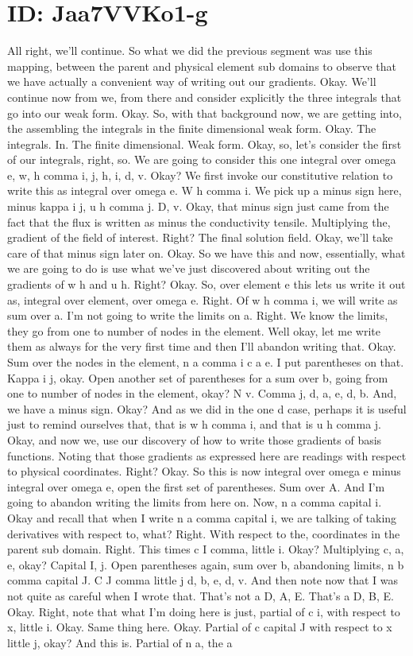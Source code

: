 \documentclass[10pt]{article}
\begin{document}
\section*{ID: Jaa7VVKo1-g}
All right, we'll continue. So what we did the previous segment was use this mapping, between the parent and physical element sub domains to observe that we have actually a convenient way of writing out our gradients. Okay. We'll continue now from we, from there and consider explicitly the three integrals that go into our weak form. Okay. So, with that background now, we are getting into, the assembling the integrals in the finite dimensional weak form. Okay. The integrals. In. The finite dimensional. Weak form. Okay, so, let's consider the first of our integrals, right, so. We are going to consider this one integral over omega e, w, h comma i, j, h, i, d, v. Okay? We first invoke our constitutive relation to write this as integral over omega e. W h comma i. We pick up a minus sign here, minus kappa i j, u h comma j. D, v. Okay, that minus sign just came from the fact that the flux is written as minus the conductivity tensile. Multiplying the, gradient of the field of interest. Right? The final solution field. Okay, we'll take care of that minus sign later on. Okay. So we have this and now, essentially, what we are going to do is use what we've just discovered about writing out the gradients of w h and u h. Right? Okay. So, over element e this lets us write it out as, integral over element, over omega e. Right. Of w h comma i, we will write as sum over a. I'm not going to write the limits on a. Right. We know the limits, they go from one to number of nodes in the element. Well okay, let me write them as always for the very first time and then I'll abandon writing that. Okay. Sum over the nodes in the element, n a comma i c a e. I put parentheses on that. Kappa i j, okay. Open another set of parentheses for a sum over b, going from one to number of nodes in the element, okay? N v. Comma j, d, a, e, d, b. And, we have a minus sign. Okay? And as we did in the one d case, perhaps it is useful just to remind ourselves that, that is w h comma i, and that is u h comma j. Okay, and now we, use our discovery of how to write those gradients of basis functions. Noting that those gradients as expressed here are readings with respect to physical coordinates. Right? Okay. So this is now integral over omega e minus integral over omega e, open the first set of parentheses. Sum over A. And I'm going to abandon writing the limits from here on. Now, n a comma capital i. Okay and recall that when I write n a comma capital i, we are talking of taking derivatives with respect to, what? Right. With respect to the, coordinates in the parent sub domain. Right. This times c I comma, little i. Okay? Multiplying c, a, e, okay? Capital I, j. Open parentheses again, sum over b, abandoning limits, n b comma capital J. C J comma little j d, b, e, d, v. And then note now that I was not quite as careful when I wrote that. That's not a D, A, E. That's a D, B, E. Okay. Right, note that what I'm doing here is just, partial of c i, with respect to x, little i. Okay. Same thing here. Okay. Partial of c capital J with respect to x little j, okay? And this is. Partial of n a, the a 
\end{document}
